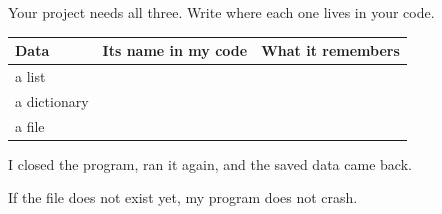 \begin{exercise}
Your project needs all three. Write where each one lives in your code.

\renewcommand{\arraystretch}{1.6}
\begin{tabularx}{\linewidth}{|p{2.6cm}|X|X|}
\hline
\textbf{Data} & \textbf{Its name in my code} & \textbf{What it remembers} \\ \hline
a list & & \\ \hline
a dictionary & & \\ \hline
a file & & \\ \hline
\end{tabularx}

\begin{checklist}
  \item I closed the program, ran it again, and the saved data came back.
  \item If the file does not exist yet, my program does not crash.
\end{checklist}
\end{exercise}

